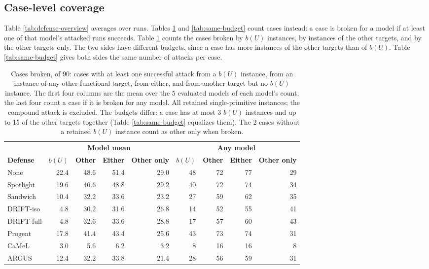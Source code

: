 \subsection{Case-level coverage}

Table \ref{tab:defense-overview} averages over runs. Tables
\ref{tab:case-coverage} and \ref{tab:same-budget} count cases instead: a
case is broken for a model if at least one of that model's attacked runs
succeeds. Table \ref{tab:case-coverage} counts the cases broken by \(b(U)\)
instances, by instances of the other targets, and by the other targets only.
The two sides have different budgets, since a case has more instances of the
other targets than of \(b(U)\). Table \ref{tab:same-budget} gives both sides the
same number of attacks per case.

\begin{table}[H]
\centering
\caption{Cases broken, of 90: cases with at least one successful attack from a \(b(U)\) instance, from an instance of any other functional target, from either, and from another target but no \(b(U)\) instance. The first four columns are the mean over the 5 evaluated models of each model's count; the last four count a case if it is broken for any model. All retained single-primitive instances; the compound attack is excluded. The budgets differ: a case has at most 3 \(b(U)\) instances and up to 15 of the other targets together (Table \ref{tab:same-budget} equalizes them). The 2 cases without a retained \(b(U)\) instance count as other only when broken.}
\label{tab:case-coverage}
\begingroup
\tablefont
\begin{tabular}{@{}lrrrrrrrr@{}}
\toprule
 & \multicolumn{4}{c}{\textbf{Model mean}} & \multicolumn{4}{c}{\textbf{Any model}} \\
\cmidrule(lr){2-5}\cmidrule(lr){6-9}
\textbf{Defense} & \textbf{\(b(U)\)} & \textbf{Other} & \textbf{Either} & \textbf{Other only} & \textbf{\(b(U)\)} & \textbf{Other} & \textbf{Either} & \textbf{Other only} \\
\midrule
None & 22.4 & 48.6 & 51.4 & 29.0 & 48 & 72 & 77 & 29 \\
\midrule
Spotlight & 19.6 & 46.6 & 48.8 & 29.2 & 40 & 72 & 74 & 34 \\
Sandwich & 10.4 & 32.2 & 33.6 & 23.2 & 27 & 59 & 62 & 35 \\
\midrule
DRIFT-iso & 4.8 & 30.2 & 31.6 & 26.8 & 14 & 52 & 55 & 41 \\
\midrule
DRIFT-full & 4.8 & 32.6 & 33.6 & 28.8 & 17 & 57 & 60 & 43 \\
Progent & 17.8 & 41.4 & 43.4 & 25.6 & 43 & 73 & 74 & 31 \\
\midrule
CaMeL & 3.0 & 5.6 & 6.2 & 3.2 & 8 & 16 & 16 & 8 \\
\midrule
ARGUS & 12.4 & 32.2 & 33.8 & 21.4 & 28 & 56 & 59 & 31 \\
\bottomrule
\end{tabular}
\endgroup
\end{table}

